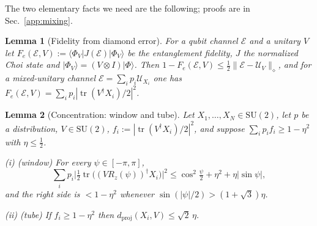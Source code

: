\documentclass[aps,prx,twocolumn,superscriptaddress,nofootinbib,longbibliography]{revtex4-2}
\theoremstyle{plain}
\newtheorem{lemma}{Lemma}
\theoremstyle{definition}
\theoremstyle{remark}
\newcommand{\dproj}{d_{\mathrm{proj}}}
\newcommand{\SU}{\mathrm{SU}(2)}
\newcommand{\tr}{\operatorname{tr}}
\begin{document}
The two elementary facts we need are the following; proofs are in Sec.~\ref{app:mixing}.

\begin{lemma}[Fidelity from diamond error]\label{lem:fid}
For a qubit channel $\mathcal E$ and a unitary $V$ let $F_e(\mathcal E,V):=\langle\Phi_V|J(\mathcal E)|\Phi_V\rangle$ be the entanglement fidelity, $J$ the normalized Choi state and $|\Phi_V\rangle=(V\otimes I)|\Phi\rangle$. Then $1-F_e(\mathcal E,V)\le\tfrac12\|\mathcal E-\mathcal U_V\|_\diamond$, and for a mixed-unitary channel $\mathcal E=\sum_ip_i\mathcal U_{X_i}$ one has $F_e(\mathcal E,V)=\sum_ip_i|\tr(V^\dagger X_i)/2|^2$.
\end{lemma}

\begin{lemma}[Concentration: window and tube]\label{lem:conc}
Let $X_1,\dots,X_N\in\SU$, let $p$ be a distribution, $V\in\SU$, $f_i:=|\tr(V^\dagger X_i)/2|^2$, and suppose $\sum_ip_if_i\ge1-\eta^2$ with $\eta\le\tfrac12$.

(i) \emph{(window)} For every $\psi\in[-\pi,\pi]$,
\begin{equation}\label{eq:window}
\sum_ip_i\Big|\tfrac12\tr\big((VR_z(\psi))^\dagger X_i\big)\Big|^2\le\cos^2\tfrac\psi2+\eta^2+\eta|\sin\psi|,
\end{equation}
and the right side is $<1-\eta^2$ whenever $\sin(|\psi|/2)>(1+\sqrt3)\eta$.

(ii) \emph{(tube)} If $f_i\ge1-\eta^2$ then $\dproj(X_i,V)\le\sqrt2\,\eta$.
\end{lemma}
\end{document}
